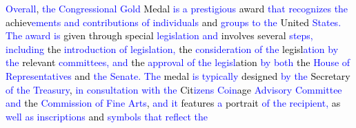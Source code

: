\begin{tcolorbox}
    \textcolor{blue}{Over}\textcolor{blue}{all}\textcolor{black}{,} \textcolor{blue}{the} \textcolor{blue}{Cong}\textcolor{blue}{r}\textcolor{blue}{essional} \textcolor{blue}{Gold} \textcolor{black}{Medal} \textcolor{blue}{is} \textcolor{blue}{a} \textcolor{blue}{pr}\textcolor{blue}{estig}\textcolor{blue}{ious} \textcolor{black}{award} \textcolor{blue}{that} \textcolor{blue}{recogn}\textcolor{blue}{izes} \textcolor{blue}{the} \textcolor{black}{achiev}\textcolor{blue}{ements} \textcolor{blue}{and} \textcolor{blue}{contributions} \textcolor{blue}{of} \textcolor{blue}{individuals} \textcolor{black}{and} \textcolor{blue}{groups} \textcolor{blue}{to} \textcolor{blue}{the} \textcolor{black}{United} \textcolor{blue}{States}\textcolor{blue}{.} \textcolor{blue}{The} \textcolor{blue}{award} \textcolor{blue}{is} \textcolor{black}{given} \textcolor{black}{through} \textcolor{black}{special} \textcolor{blue}{legisl}\textcolor{blue}{ation} \textcolor{blue}{and} \textcolor{black}{involves} \textcolor{black}{several} \textcolor{blue}{steps}\textcolor{blue}{,} \textcolor{blue}{including} \textcolor{black}{the} \textcolor{blue}{introduction} \textcolor{blue}{of} \textcolor{blue}{legisl}\textcolor{blue}{ation}\textcolor{blue}{,} \textcolor{black}{the} \textcolor{blue}{consideration} \textcolor{blue}{of} \textcolor{blue}{the} \textcolor{black}{legisl}\textcolor{blue}{ation} \textcolor{blue}{by} \textcolor{blue}{the} \textcolor{black}{relevant} \textcolor{blue}{comm}\textcolor{blue}{itte}\textcolor{blue}{es}\textcolor{blue}{,} \textcolor{blue}{and} \textcolor{black}{the} \textcolor{blue}{appro}\textcolor{blue}{val} \textcolor{blue}{of} \textcolor{blue}{the} \textcolor{blue}{legisl}\textcolor{black}{ation} \textcolor{blue}{by} \textcolor{blue}{both} \textcolor{black}{the} \textcolor{blue}{House} \textcolor{blue}{of} \textcolor{blue}{Representatives} \textcolor{black}{and} \textcolor{blue}{the} \textcolor{blue}{Senate}\textcolor{blue}{.} \textcolor{blue}{The} \textcolor{black}{medal} \textcolor{blue}{is} \textcolor{blue}{typically} \textcolor{black}{designed} \textcolor{blue}{by} \textcolor{blue}{the} \textcolor{black}{Secretary} \textcolor{blue}{of} \textcolor{blue}{the} \textcolor{blue}{Tre}\textcolor{blue}{as}\textcolor{blue}{ury}\textcolor{black}{,} \textcolor{blue}{in} \textcolor{blue}{consult}\textcolor{blue}{ation} \textcolor{blue}{with} \textcolor{blue}{the} \textcolor{black}{Cit}\textcolor{blue}{iz}\textcolor{blue}{ens} \textcolor{blue}{Co}\textcolor{blue}{in}\textcolor{black}{age} \textcolor{blue}{Ad}\textcolor{blue}{vis}\textcolor{blue}{ory} \textcolor{blue}{Committee} \textcolor{blue}{and} \textcolor{black}{the} \textcolor{blue}{Commission} \textcolor{blue}{of} \textcolor{blue}{Fine} \textcolor{blue}{Arts}\textcolor{black}{,} \textcolor{blue}{and} \textcolor{blue}{it} \textcolor{black}{features} \textcolor{blue}{a} \textcolor{black}{portrait} \textcolor{blue}{of} \textcolor{blue}{the} \textcolor{blue}{recip}\textcolor{blue}{ient}\textcolor{blue}{,} \textcolor{black}{as} \textcolor{blue}{well} \textcolor{blue}{as} \textcolor{blue}{ins}\textcolor{blue}{cri}\textcolor{blue}{ptions} \textcolor{black}{and} \textcolor{blue}{symbols} \textcolor{blue}{that} \textcolor{blue}{reflect} \textcolor{blue}{the} 
\end{tcolorbox}
